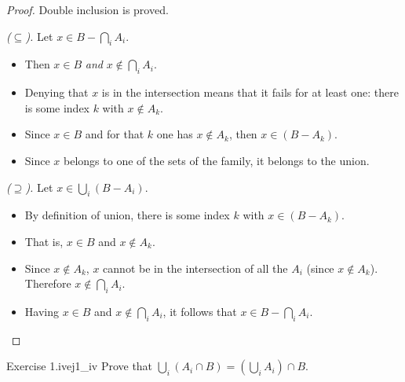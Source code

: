 \documentclass[11pt, a4paper]{article}
\begin{document}
\begin{proof}
Double inclusion is proved.

\textit{($\subseteq$).} Let $x \in B - \bigcap_{i} A_i$.
\begin{itemize}
    \item Then $x \in B$ \emph{and} $x \notin \bigcap_{i} A_i$.
    \item Denying that $x$ is in the intersection means that it fails for at least one: there is some
    index $k$ with $x \notin A_k$.
    \item Since $x \in B$ and for that $k$ one has $x \notin A_k$, then $x \in (B - A_k)$.
    \item Since $x$ belongs to one of the sets of the family, it belongs to the union.
\end{itemize}

\textit{($\supseteq$).} Let $x \in \bigcup_{i} (B - A_i)$.
\begin{itemize}
    \item By definition of union, there is some index $k$ with $x \in (B - A_k)$.
    \item That is, $x \in B$ and $x \notin A_k$.
    \item Since $x \notin A_k$, $x$ cannot be in the intersection of all the $A_i$ (since $x \notin A_k$). Therefore $x \notin \bigcap_{i} A_i$.
    \item Having $x \in B$ and $x \notin \bigcap_{i} A_i$, it follows that $x \in B - \bigcap_{i} A_i$.
\end{itemize}
\end{proof}

\begin{proposicion}{Exercise 1.iv}{ej1_iv}
Prove that $\bigcup_{i} (A_i \cap B) = (\bigcup_{i} A_i) \cap B$.
\end{proposicion}
\end{document}

